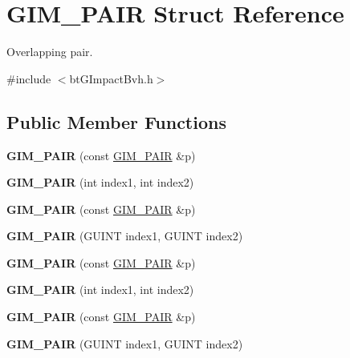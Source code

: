 \hypertarget{structGIM__PAIR}{}\section{G\+I\+M\+\_\+\+P\+A\+IR Struct Reference}
\label{structGIM__PAIR}


Overlapping pair.  




{\ttfamily \#include $<$bt\+G\+Impact\+Bvh.\+h$>$}

\subsection*{Public Member Functions}
\begin{DoxyCompactItemize}
\item 
\mbox{\label{structGIM__PAIR_ac2b1feaa0be24ed4bd4934dce7110bb6}} 
{\bfseries G\+I\+M\+\_\+\+P\+A\+IR} (const \hyperlink{structGIM__PAIR}{G\+I\+M\+\_\+\+P\+A\+IR} \&p)
\item 
\mbox{\label{structGIM__PAIR_aef2b03ca37fa350eee6ebb4980d24089}} 
{\bfseries G\+I\+M\+\_\+\+P\+A\+IR} (int index1, int index2)
\item 
\mbox{\label{structGIM__PAIR_ac2b1feaa0be24ed4bd4934dce7110bb6}} 
{\bfseries G\+I\+M\+\_\+\+P\+A\+IR} (const \hyperlink{structGIM__PAIR}{G\+I\+M\+\_\+\+P\+A\+IR} \&p)
\item 
\mbox{\label{structGIM__PAIR_ab8e524c274a40b5745e2329722911fa5}} 
{\bfseries G\+I\+M\+\_\+\+P\+A\+IR} (G\+U\+I\+NT index1, G\+U\+I\+NT index2)
\item 
\mbox{\label{structGIM__PAIR_ac2b1feaa0be24ed4bd4934dce7110bb6}} 
{\bfseries G\+I\+M\+\_\+\+P\+A\+IR} (const \hyperlink{structGIM__PAIR}{G\+I\+M\+\_\+\+P\+A\+IR} \&p)
\item 
\mbox{\label{structGIM__PAIR_aef2b03ca37fa350eee6ebb4980d24089}} 
{\bfseries G\+I\+M\+\_\+\+P\+A\+IR} (int index1, int index2)
\item 
\mbox{\label{structGIM__PAIR_ac2b1feaa0be24ed4bd4934dce7110bb6}} 
{\bfseries G\+I\+M\+\_\+\+P\+A\+IR} (const \hyperlink{structGIM__PAIR}{G\+I\+M\+\_\+\+P\+A\+IR} \&p)
\item 
\mbox{\label{structGIM__PAIR_ab8e524c274a40b5745e2329722911fa5}} 
{\bfseries G\+I\+M\+\_\+\+P\+A\+IR} (G\+U\+I\+NT index1, G\+U\+I\+NT index2)
\end{DoxyCompactItemize}
